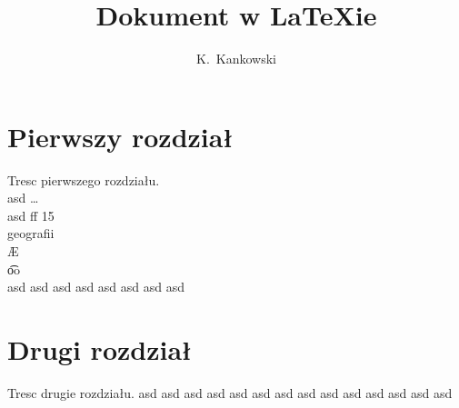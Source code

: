 \documentclass[a4paper,11pt]{article}
\author{K.~Kankowski}
\title{Dokument w LaTeXie}
\begin{document}
\maketitle
\tableofcontents
\section{Pierwszy rozdział}
Tresc pierwszego rozdziału.\\
asd \ldots \\
asd\newline
ff 15\\
geografii\\
\AE\\
\t oo\\
asd\newline
asd\newline
asd\newline
asd\newline
asd\newline
asd\newline
asd\newline
asd\newline
\section{Drugi rozdział}
Tresc drugie rozdziału.
asd\newline
asd\newline
asd\newline
asd\newline
asd\newline
asd\newline
asd\newline
asd\newline
asd\newline
asd\newline
asd\newline
asd\newline
asd\newline
asd\newline
\end{document}
